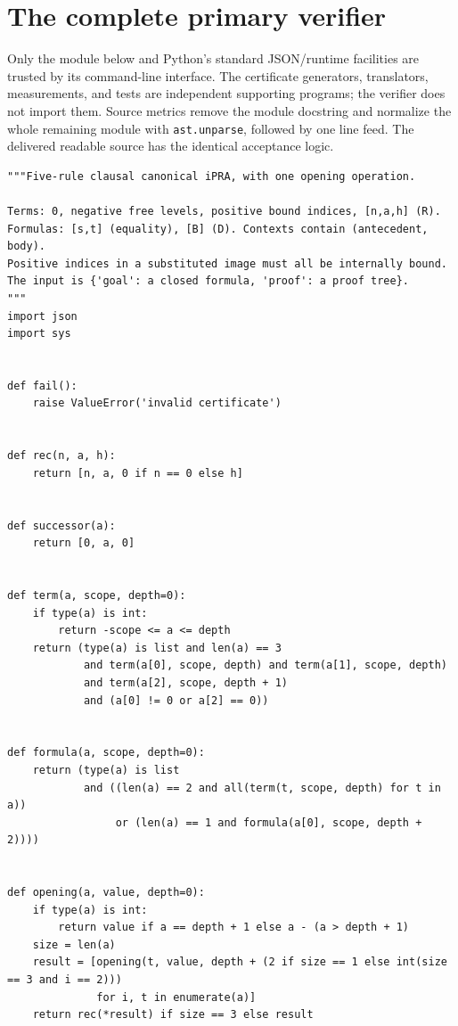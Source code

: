\documentclass[11pt,letterpaper]{article}
\theoremstyle{definition}\newtheorem{definition}[theorem]{Definition}
\newcommand{\file}[1]{\texttt{\small\nolinkurl{#1}}}
\begin{document}
\section{The complete primary verifier}
Only the module below and Python's standard JSON/runtime facilities are trusted by its command-line interface. The certificate generators, translators, measurements, and tests are independent supporting programs; the verifier does not import them. Source metrics remove the module docstring and normalize the whole remaining module with \file{ast.unparse}, followed by one line feed. The delivered readable source has the identical acceptance logic.
\begin{lstlisting}
"""Five-rule clausal canonical iPRA, with one opening operation.

Terms: 0, negative free levels, positive bound indices, [n,a,h] (R).
Formulas: [s,t] (equality), [B] (D). Contexts contain (antecedent, body).
Positive indices in a substituted image must all be internally bound.
The input is {'goal': a closed formula, 'proof': a proof tree}.
"""
import json
import sys


def fail():
    raise ValueError('invalid certificate')


def rec(n, a, h):
    return [n, a, 0 if n == 0 else h]


def successor(a):
    return [0, a, 0]


def term(a, scope, depth=0):
    if type(a) is int:
        return -scope <= a <= depth
    return (type(a) is list and len(a) == 3
            and term(a[0], scope, depth) and term(a[1], scope, depth)
            and term(a[2], scope, depth + 1)
            and (a[0] != 0 or a[2] == 0))


def formula(a, scope, depth=0):
    return (type(a) is list
            and ((len(a) == 2 and all(term(t, scope, depth) for t in a))
                 or (len(a) == 1 and formula(a[0], scope, depth + 2))))


def opening(a, value, depth=0):
    if type(a) is int:
        return value if a == depth + 1 else a - (a > depth + 1)
    size = len(a)
    result = [opening(t, value, depth + (2 if size == 1 else int(size == 3 and i == 2)))
              for i, t in enumerate(a)]
    return rec(*result) if size == 3 else result



\end{lstlisting}
\end{document}
